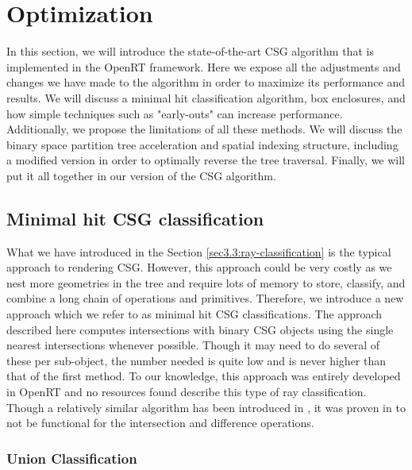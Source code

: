 \documentclass[a4paper,11pt,oneside]{article}
\begin{document}
\section{Optimization}

In this section, we will introduce the state-of-the-art CSG algorithm that is implemented in the OpenRT framework. Here we expose all the adjustments and changes we have made to the algorithm in order to maximize its performance and results. We will discuss a minimal hit classification algorithm, box enclosures, and how simple techniques such as "early-outs" can increase performance. Additionally, we propose the limitations of all these methods. We will discuss the binary space partition tree acceleration and spatial indexing structure, including a modified version in order to optimally reverse the tree traversal. Finally, we will put it all together in our version of the CSG algorithm.

\subsection{Minimal hit CSG classification}
\label{section:classification-optimization}


What we have introduced in the Section \ref{sec3.3:ray-classification} is the typical approach to rendering CSG. However, this approach could be very costly as we nest more geometries in the tree and require lots of memory to store, classify, and combine a long chain of operations and primitives. Therefore, we introduce a new approach which we refer to as minimal hit CSG classifications. The approach described here computes intersections with binary CSG objects using the single nearest intersections whenever possible. Though it may need to do several of these per sub-object, the number needed is quite low and is never higher than that of the first method. To our knowledge, this approach was entirely developed in OpenRT and no resources found describe this type of ray classification. Though a relatively similar algorithm has been introduced in \cite{kensler_ray_2006}, it was proven in \cite{csg-xrt-renderer} to not be functional for the intersection and difference operations.

\subsubsection{Union Classification}
\end{document}

